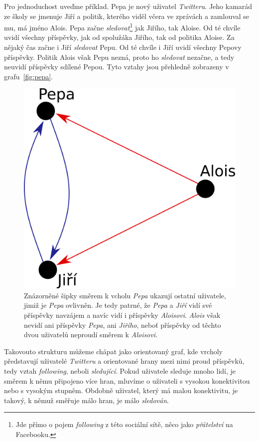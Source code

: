 \documentclass[12pt, a4paper]{article}
\numberwithin{equation}{section} 	%
\begin{document}
Pro jednoduchost uveďme příklad. Pepa je nový uživatel \textit{Twitteru}. Jeho kamarád ze školy se jmenuje Jiří a politik, kterého viděl včera ve zprávách a zamlouval se mu, má jméno Alois. Pepa začne \textit{sledovat}\footnote{Jde přímo o pojem \textit{following} z této sociální sítě, něco jako \textit{přátelství} na Facebooku.} jak Jiřího, tak Aloise. Od té chvíle uvidí všechny příspěvky, jak od spolužáka Jiřího, tak od politika Aloise. Za nějaký čas začne i Jiří \textit{sledovat} Pepu. Od té chvíle i Jiří uvidí všechny Pepovy příspěvky. Politik Alois však Pepu nezná, proto ho \textit{sledovat} nezačne, a tedy neuvidí příspěvky sdílené Pepou. Tyto vztahy jsou přehledně zobrazeny v grafu~\autoref{fig:pepa}.
\begin{figure}[h]
\centering
\includegraphics[scale=0.35]{./Pics/pepa.png}
    \caption{Znázorněné šipky směrem k vcholu \textit{Pepa} ukazují ostatní uživatele, jimiž je \textit{Pepa} ovlivněn. Je tedy patrné, že \textit{Pepa} a \textit{Jiří} vidí své příspěvky navzájem a navíc vidí i příspěvky \textit{Aloisovi}. \textit{Alois} však nevidí ani příspěvky \textit{Pepa}, ani \textit{Jiřího}, neboť příspěvky od těchto dvou uživatelů neproudí směrem k \textit{Aloisovi}.}
\label{fig:pepa}
\end{figure}

Takovouto strukturu můžeme chápat jako orientovaný graf, kde vrcholy před\-sta\-vu\-jí uživatelé \textit{Twitteru} a orientované hrany mezi nimi proud příspěvků, tedy vztah \textit{following}, neboli \textit{sledující}. Pokud uživatele sleduje mnoho lidí, je směrem k němu připojeno více hran, mluvíme o uživateli s vysokou konektivitou nebo s vysokým stupněm. Obdobně uživatel, který má malou konektivitu, je takový, k němuž směřuje málo hran, je málo \textit{sledován}.
\end{document}
